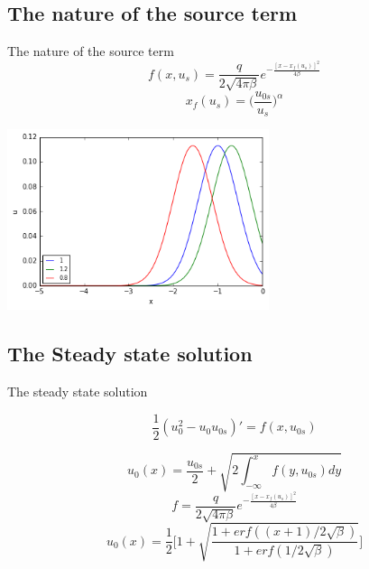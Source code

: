 \documentclass{beamer}
\begin{document}
	
\subsection{The nature of the source term}
\begin{frame}{The nature of the source term}
	\[f(x,u_{s})= \frac{q}{2\sqrt{4\pi \beta}} e^{-\frac{[x-x_f(u_s)]^2}{4\beta}}\]
	\[x_f(u_s) = \bigg(\frac{u_{0s}}{u_{s}}\bigg)^\alpha\]

  \begin{center}
  	\includegraphics[height=150pt]{shiftinit}\\
  	
  \end{center}

\end{frame}	

\subsection{The Steady state solution}
\begin{frame}{The steady state solution}
	
	
	\[\frac{1}{2}(u_0^2-u_0u_{0s})' =f(x,u_{0s}) \]
	
	\[u_0(x)=\frac{u_{0s}}{2}+ \sqrt{2\int_{-\infty}^{x}f(y,u_{0s})dy}\]
	\[f= \frac{q}{2\sqrt{4\pi \beta}} e^{-\frac{[x-x_f(u_s)]^2}{4\beta}}\]
	\[u_0(x)= \frac{1}{2}\bigg[1+ \sqrt{\frac{1+erf((x+1)/2\sqrt{\beta})}{1+erf(1/2\sqrt{\beta})}}\bigg]\]
	
\end{frame}
	
\end{document}
